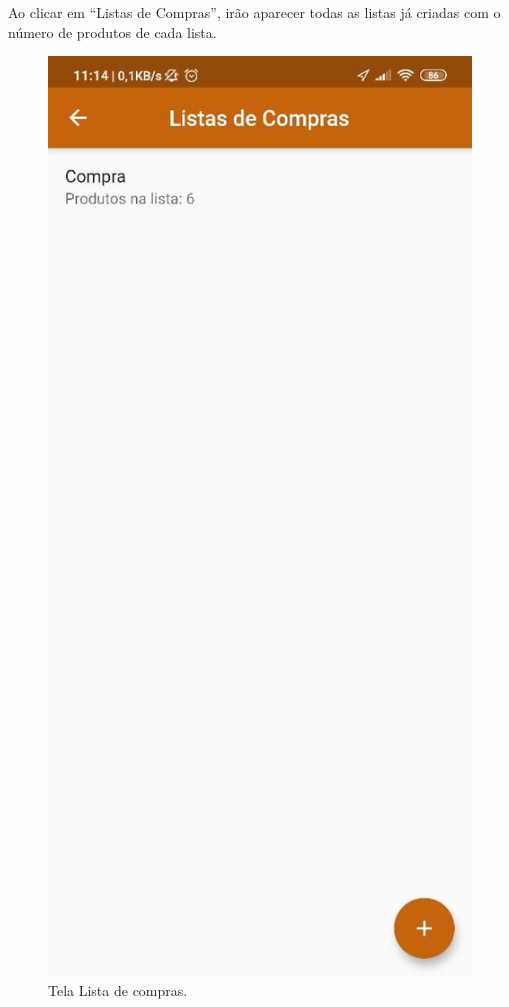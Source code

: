 Ao clicar em “Listas de Compras”, irão aparecer todas as listas já criadas com o número de produtos de cada lista.
\begin{figure}[H]
    \centering
    \caption{Tela Lista de compras.}
    \includegraphics[scale=0.3]{Imagens/Print05.png}
\end{figure}


